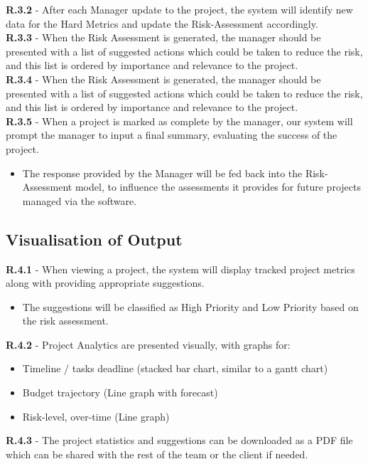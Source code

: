 \documentclass[a4paper]{article}
\theoremstyle{plain}
\theoremstyle{definition}
\theoremstyle{remark}
\begin{document}
\noindent\textbf{R.3.2} - After each Manager update to the project, the system will identify new data for the Hard Metrics and update the Risk-Assessment accordingly. \\

\noindent\textbf{R.3.3} - When the Risk Assessment is generated, the manager should be presented with a list of suggested actions which could be taken to reduce the risk, and this list is ordered by importance and relevance to the project. \\

\noindent\textbf{R.3.4} - When the Risk Assessment is generated, the manager should be presented with a list of suggested actions which could be taken to reduce the risk, and this list is ordered by importance and relevance to the project. \\

\noindent\textbf{R.3.5} - When a project is marked as complete by the manager, our system will prompt the manager to input a final summary, evaluating the success of the project.
\vspace{-0.15cm}
\begin{itemize}
	\item The response provided by the Manager will be fed back into the Risk-Assessment model, to influence the assessments it provides for future projects managed via the software.
\end{itemize}
\subsection*{Visualisation of Output}
\textbf{R.4.1} - When viewing a project, the system will display tracked project metrics along with providing appropriate suggestions.
\begin{itemize}
	\item The suggestions will be classified as High Priority and Low Priority based on the risk assessment. 
\end{itemize}
\textbf{R.4.2} - Project Analytics are presented visually, with graphs for:
\begin{itemize}
	\item Timeline / tasks deadline (stacked bar chart, similar to a gantt chart)
	\item Budget trajectory (Line graph with forecast)
	\item Risk-level, over-time (Line graph)
\end{itemize}
\textbf{R.4.3} - The project statistics and suggestions can be downloaded as a PDF file which can be shared with the rest of the team or the client if needed.
\end{document}
